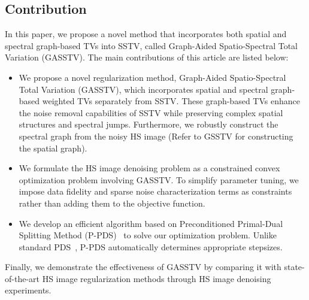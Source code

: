 \subsection{Contribution}
\label{sec:contribution}
In this paper, we propose a novel method that incorporates both spatial and spectral graph-based TVs into SSTV, called Graph-Aided Spatio-Spectral Total Variation (GASSTV).
The main contributions of this article are listed below:
\begin{itemize}
    \setlength{\leftskip}{-10pt}
    \item We propose a novel regularization method, Graph-Aided Spatio-Spectral Total Variation (GASSTV), which incorporates spatial and spectral graph-based weighted TVs separately from SSTV. These graph-based TVs enhance the noise removal capabilities of SSTV while preserving complex spatial structures and spectral jumps. Furthermore, we robustly construct the spectral graph from the noisy HS image (Refer to GSSTV for constructing the spatial graph).
    \item We formulate the HS image denoising problem as a constrained convex optimization problem involving GASSTV. To simplify parameter tuning, we impose data fidelity and sparse noise characterization terms as constraints rather than adding them to the objective function.
    \item We develop an efficient algorithm based on Preconditioned Primal-Dual Splitting Method (P-PDS)~\cite{Pock2011PPDS, Naganuma2023PPDS} to solve our optimization problem. Unlike standard PDS~\cite{Chambolle2011PDS, Condat2013PDS}, P-PDS automatically determines appropriate stepsizes.
\end{itemize}
Finally, we demonstrate the effectiveness of GASSTV by comparing it with state-of-the-art HS image regularization methods through HS image denoising experiments.